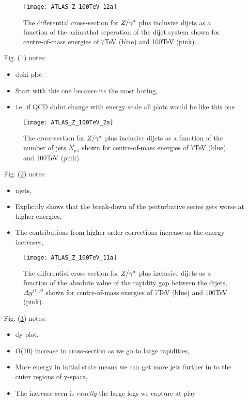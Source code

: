 	\begin{figure}[h]
		\centering
		\texttt{[image: ATLAS\_Z\_100TeV\_12a]}
		\caption{The differential cross-section for $Z/\gamma^*$ plus inclusive dijets as a function of the azimuthal seperation of the dijet system shown for
		         centre-of-mass energies of 7TeV (blue) and 100TeV (pink).}
		\label{fig:100tev_12a}
	\end{figure}

	Fig. (\ref{fig:100tev_12a}) notes:

	\begin{itemize}
		\item dphi plot
		\item Start with this one because its the most boring,
		\item i.e. if QCD didnt change with energy scale all plots would be like this one
	\end{itemize}

	\begin{figure}[h]
		\centering
		\texttt{[image: ATLAS\_Z\_100TeV\_2a]}
		\caption{The cross-section for $Z/\gamma^*$ plus inclusive dijets as a function of the number of jets $N_{\text{jet}}$ shown for
		         centre-of-mass energies of 7TeV (blue) and 100TeV (pink).}
		\label{fig:100tev_2a}
	\end{figure}

	Fig. (\ref{fig:100tev_2a}) notes:

	\begin{itemize}
		\item njets,
		\item Explicitly shows that the break-down of the perturbative series gets worse at higher energies,
		\item The contributions from higher-order corrections increase as the energy increases,
	\end{itemize}

	\begin{figure}[h]
		\centering
		\texttt{[image: ATLAS\_Z\_100TeV\_11a]}
		\caption{The differential cross-section for $Z/\gamma^*$ plus inclusive dijets as a function of the absolute value of the
		         rapidity gap between the dijets, $\Delta y^{j1, j2}$ shown for centre-of-mass energies of 7TeV (blue) and
		         100TeV (pink).}
		\label{fig:100tev_11a}
	\end{figure}

	Fig. (\ref{fig:100tev_11a}) notes:

	\begin{itemize}
		\item dy plot,
		\item O(10) increase in cross-section as we go to large rapidities,
		\item More energy in initial state means we can get more jets further in to the outer regions of y-space,
		\item The increase seen is \emph{exactly} the large logs we capture at play
	\end{itemize}

